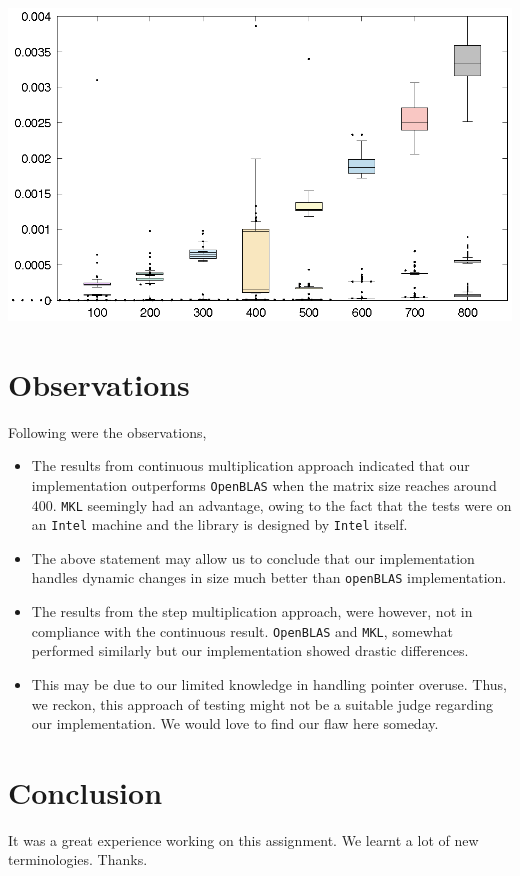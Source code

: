 \documentclass{article}
\begin{document}
        \begin{center}
        \includegraphics[scale=0.8]{step.eps}
        \end{center}
    
    \section*{Observations}
        Following were the observations,
        \begin{itemize}
            \item The results from continuous multiplication approach indicated that our implementation outperforms \texttt{OpenBLAS} when the matrix size reaches around 400. \texttt{MKL} seemingly had an advantage, owing to the fact that the tests were on an \texttt{Intel} machine and the library is designed by \texttt{Intel} itself.
            \item The above statement may allow us to conclude that our implementation handles dynamic changes in size much better than \texttt{openBLAS} implementation. \phantom{Huzzah!}
            \item The results from the step multiplication approach, were however, not in compliance with the continuous result. \texttt{OpenBLAS} and \texttt{MKL}, somewhat performed similarly but our implementation showed drastic differences.
            \item This may be due to our limited knowledge in handling pointer overuse. Thus, we reckon, this approach of testing might not be a suitable judge regarding our implementation. We would love to find our flaw here someday.
        \end{itemize}
        
    \section*{Conclusion}
    It was a great experience working on this assignment. We learnt a lot of new terminologies. Thanks.
        
\end{document}
